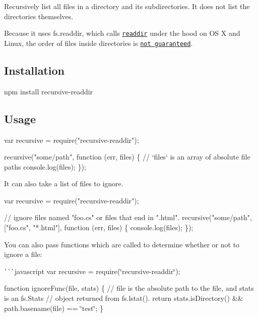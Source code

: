 \href{https://travis-ci.org/jergason/recursive-readdir}{\tt }

Recursively list all files in a directory and its subdirectories. It does not list the directories themselves.

Because it uses fs.\+readdir, which calls \href{http://linux.die.net/man/3/readdir}{\tt readdir} under the hood on OS X and Linux, the order of files inside directories is \href{http://stackoverflow.com/questions/8977441/does-readdir-guarantee-an-order}{\tt not guaranteed}.

\subsection*{Installation}

\begin{DoxyVerb}npm install recursive-readdir
\end{DoxyVerb}


\subsection*{Usage}


\begin{DoxyCode}
var recursive = require("recursive-readdir");

recursive("some/path", function (err, files) \{
  // `files` is an array of absolute file paths
  console.log(files);
\});
\end{DoxyCode}


It can also take a list of files to ignore.


\begin{DoxyCode}
var recursive = require("recursive-readdir");

// ignore files named "foo.cs" or files that end in ".html".
recursive("some/path", ["foo.cs", "*.html"], function (err, files) \{
  console.log(files);
\});
\end{DoxyCode}


You can also pass functions which are called to determine whether or not to ignore a file\+:

\`{}\`{}\`{}javascript var recursive = require(\char`\"{}recursive-\/readdir\char`\"{});

function ignore\+Func(file, stats) \{ // {\ttfamily file} is the absolute path to the file, and {\ttfamily stats} is an {\ttfamily fs.\+Stats} // object returned from {\ttfamily fs.\+lstat()}. return stats.\+is\+Directory() \&\& path.\+basename(file) == \char`\"{}test\char`\"{}; \}


